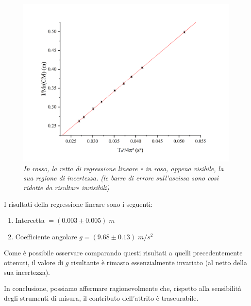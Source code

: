 \documentclass{article}
\begin{document}
\begin{figure}[H]
  \includegraphics[trim={2cm 1cm 2cm 2.1cm},clip,width=\textwidth]{img/regressione-2.png}
  \caption[]{\emph{
    In rosso, la retta di regressione lineare e in rosa,
    appena visibile, la sua regione di incertezza.
    (le barre di errore sull'ascissa sono così ridotte
    da risultare invisibili)
  }}
\end{figure}

I risultati della regressione lineare sono i seguenti:
\begin{enumerate}
  \item Intercetta $= (0.003 \pm 0.005)\;\unit{m}$
  \item Coefficiente angolare $g = (9.68 \pm 0.13)\;\unit{m\per s^2}$
\end{enumerate}

Come è possibile osservare comparando questi risultati a
quelli precedentemente ottenuti, il valore di $g$ risultante
è rimasto essenzialmente invariato (al netto della sua incertezza).

In conclusione, possiamo affermare ragionevolmente che,
rispetto alla sensibilità degli strumenti di misura,
il contributo dell'attrito è trascurabile.
\end{document}
